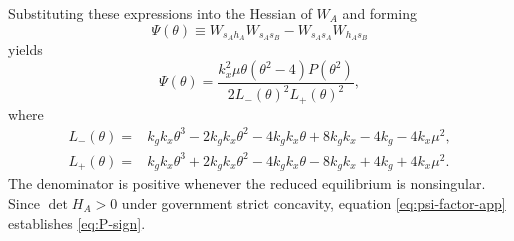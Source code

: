 Substituting these expressions into the Hessian of $W_A$ and forming
\[
\Psi(\theta)
\equiv
W_{s_Ah_A}W_{s_As_B}-W_{s_As_A}W_{h_As_B}
\]
yields
\begin{equation}
\Psi(\theta)
=
\frac{k_x^2\mu\theta(\theta^2-4)P(\theta^2)}
{2L_-(\theta)^2L_+(\theta)^2},
\label{eq:psi-factor-app}
\end{equation}
where
\begin{align*}
L_-(\theta)
={}&k_gk_x\theta^3-2k_gk_x\theta^2-4k_gk_x\theta+8k_gk_x-4k_g-4k_x\mu^2,\\
L_+(\theta)
={}&k_gk_x\theta^3+2k_gk_x\theta^2-4k_gk_x\theta-8k_gk_x+4k_g+4k_x\mu^2.
\end{align*}
The denominator is positive whenever the reduced equilibrium is nonsingular. Since $\det H_A>0$ under government strict concavity, equation \eqref{eq:psi-factor-app} establishes \eqref{eq:P-sign}.

